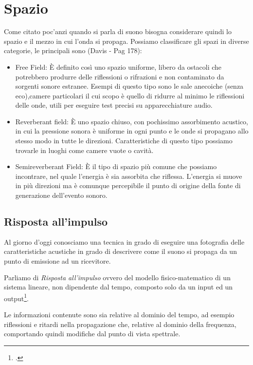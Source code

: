 \section{Spazio}

Come citato poc'anzi quando si parla di suono bisogna considerare quindi lo spazio e il mezzo in cui l'onda si propaga.
Possiamo classificare gli spazi in diverse categorie, le principali sono (Davis - Pag 178):
\begin{itemize}
\item Free Field:
È definito così uno spazio uniforme, libero da ostacoli che potrebbero produrre delle riflessioni o rifrazioni e non contaminato da sorgenti sonore estranee.
Esempi di questo tipo sono le sale anecoiche (senza eco),camere particolari il cui scopo è quello di ridurre al minimo le riflessioni delle onde, utili per eseguire test precisi su apparecchiature audio.
\item Reverberant field:
È uno spazio chiuso, con pochissimo assorbimento acustico, in cui la pressione sonora è uniforme in ogni punto e le onde si propagano allo stesso modo in tutte le direzioni.
Caratteristiche di questo tipo possiamo trovarle in luoghi come camere vuote o cavità.
\item Semireverberant Field:
È il tipo di spazio più comune che possiamo incontrare, nel quale l’energia è sia assorbita che riflessa. L’energia si muove in più direzioni ma è comunque percepibile il punto di origine della fonte di generazione dell’evento sonoro.
\end{itemize}

\subsection{Risposta all'impulso}

Al giorno d’oggi conosciamo una tecnica in grado di eseguire una fotografia delle caratteristiche acustiche in grado di descrivere come il suono si propaga da un punto di emissione ad un ricevitore.

Parliamo di \textit{Risposta all’impulso} ovvero del modello fisico-matematico di un sistema lineare, non dipendente dal tempo, composto solo da un input ed un output\footcite{af:book}.

Le informazioni contenute sono sia relative al dominio del tempo, ad esempio riflessioni e ritardi nella propagazione che, relative al dominio della frequenza, comportando quindi modifiche dal punto di vista spettrale.

